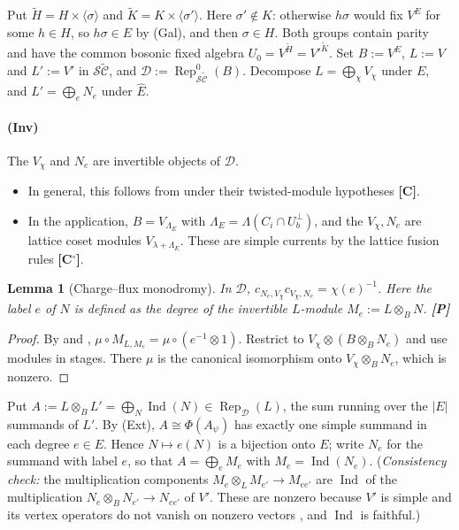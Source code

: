 \documentclass[11pt]{article}
\newtheorem{lemma}[theorem]{Lemma}
\theoremstyle{definition}
\newcommand{\cD}{\mathcal D}
\newcommand{\SC}{\mathcal S\widetilde{\mathcal C}}
\newcommand{\Rep}{\operatorname{Rep}}
\newcommand{\Ind}{\operatorname{Ind}}
\newcommand{\Ehat}{\widehat E}
\newcommand{\tH}{\widetilde H}
\newcommand{\tK}{\widetilde K}
\newcommand{\st}[1]{\textbf{[#1]}}
\begin{document}
Put $\tH=H\times\langle\sigma\rangle$ and $\tK=K\times\langle\sigma'\rangle$. Here $\sigma'\notin K$:
otherwise $h\sigma$ would fix $V^E$ for some $h\in H$, so $h\sigma\in E$ by (Gal), and then
$\sigma\in H$. Both groups contain parity and have the common bosonic fixed algebra
$U_0=V^{\tH}=V'^{\tK}$. Set $B:=V^E$, $L:=V$ and $L':=V'$ in $\SC$, and $\cD:=\Rep^0_{\SC}(B)$.
Decompose $L=\bigoplus_{\chi}V_\chi$ under $E$, and $L'=\bigoplus_eN_e$ under $\Ehat$.

\paragraph{(Inv)} The $V_\chi$ and $N_e$ are invertible objects of $\cD$.
\begin{itemize}[nosep]
\item In general, this follows from \cite[Thm~6.3, Prop.~4.17]{DJX} under their twisted-module
hypotheses \st{C}.
\item In the application, $B=V_{\Lambda_E}$ with $\Lambda_E=\Lambda(C_i\cap U_b^\perp)$, and the
$V_\chi,N_e$ are lattice coset modules $V_{\lambda+\Lambda_E}$. These are simple currents by the
lattice fusion rules \cite{DL} \st{C$^\circ$}.
\end{itemize}

\begin{lemma}[Charge--flux monodromy]\label{lem:mono}
In $\cD$, $c_{N_e,V_\chi}c_{V_\chi,N_e}=\chi(e)^{-1}$. Here the label $e$ of $N$ is \emph{defined} as
the degree of the invertible $L$-module $M_e:=L\otimes_BN$. \st{P}
\end{lemma}
\begin{proof}
By \cite[Def.~4.1]{Kir02} and \cite[Def.~2.3]{McR}, $\mu\circ M_{L,M_e}=\mu\circ(e^{-1}\otimes1)$.
Restrict to $V_\chi\otimes(B\otimes_BN_e)$ and use modules in stages. There $\mu$ is the
canonical isomorphism onto $V_\chi\otimes_BN_e$, which is nonzero.
\end{proof}

Put $A:=L\otimes_BL'=\bigoplus_{N}\Ind(N)\in\Rep_{\cD}(L)$, the sum running over the $|E|$
summands of $L'$. By (Ext), $A\cong\Phi(A_\psi)$ has exactly one simple summand in each degree
$e\in E$. Hence $N\mapsto e(N)$ is a bijection onto $E$; write $N_e$ for the summand with label
$e$, so that $A=\bigoplus_eM_e$ with $M_e=\Ind(N_e)$.
(\emph{Consistency check:} the multiplication components $M_e\otimes_LM_{e'}\to M_{ee'}$ are
$\Ind$ of the multiplication $N_e\otimes_BN_{e'}\to N_{ee'}$ of $V'$. These are nonzero because
$V'$ is simple and its vertex operators do not vanish on nonzero vectors
\cite[Lemma~4.18]{McR}, and $\Ind$ is faithful.)
\end{document}
